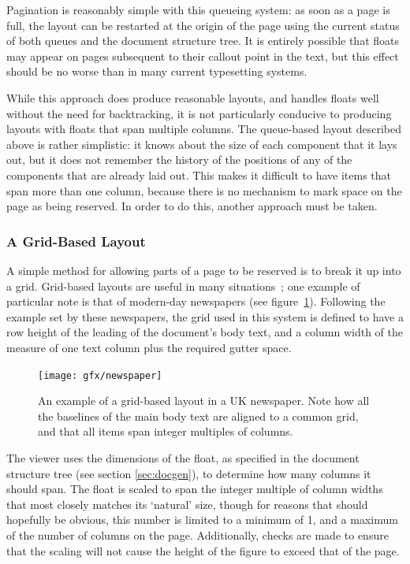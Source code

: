 Pagination is reasonably simple with this queueing system: as soon as a page is full, the layout can be restarted at the origin of the page using the current status of both queues and the document structure tree. It is entirely possible that floats may appear on pages subsequent to their callout point in the text, but this effect should be no worse than in many current typesetting systems.

While this approach does produce reasonable layouts, and handles floats well without the need for backtracking, it is not particularly conducive to producing layouts with floats that span multiple columns. The queue-based layout described above is rather simplistic: it knows about the size of each component that it lays out, but it does not remember the history of the positions of any of the components that are already laid out. This makes it difficult to have items that span more than one column, because there is no mechanism to mark space on the page as being reserved. In order to do this, another approach must be taken.

\subsubsection{A Grid-Based Layout}
A simple method for allowing parts of a page to be reserved is to break it up into a grid. Grid-based layouts are useful in many situations~\cite{Collier1991}; one example of particular note is that of modern-day newspapers (see figure~\ref{fig:gridlayout}). Following the example set by these newspapers, the grid used in this system is defined to have a row height of the leading of the document's body text, and a column width of the measure of one text column plus the required gutter space.

\begin{figure}
    \texttt{[image: gfx/newspaper]}
    \caption[An example of a grid-based layout]{An example of a grid-based layout in a UK newspaper. Note how all the baselines of the main body text are aligned to a common grid, and that all items span integer multiples of columns.}
    \label{fig:gridlayout}
\end{figure}

The viewer uses the dimensions of the float, as specified in the document structure tree (see section \ref{sec:docgen}), to determine how many columns it should span. The float is scaled to span the integer multiple of column widths that most closely matches its `natural' size, though for reasons that should hopefully be obvious, this number is limited to a minimum of 1, and a maximum of the number of columns on the page. Additionally, checks are made to ensure that the scaling will not cause the height of the figure to exceed that of the page.

